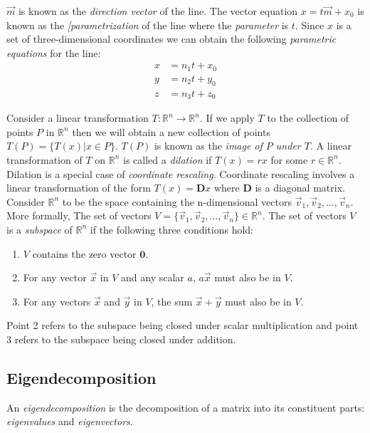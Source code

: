 \documentclass[12pt]{article}
\begin{document}
$\vec{m}$ is known as the \emph{direction vector} of the line. The vector equation $x=t\vec{m}+x_0$ is known as the \emph{[parametrization} of the line where the \emph{parameter} is $t$. Since $x$ is a set of three-dimensional coordinates we can obtain the following \emph{parametric equations} for the line:
\begin{align*}
x &= n_1t + x_0 \\
y &= n_2t + y_0 \\
z &= n_3t +z_0
\end{align*}

Consider a linear transformation $T:\mathbb{R}^n\rightarrow\mathbb{R}^n$. If we apply $T$ to the collection of points $P$ in $\mathbb{R}^n$ then we will obtain a new collection of points $T(P)=\{ T(x)|x\in P \}$. $T(P)$ is known as the \emph{image of $P$ under $T$}. A linear transformation of $T$ on $\mathbb{R}^n$ is called a \emph{dilation} if $T(x)=rx$ for some $r\in\mathbb{R}^n$. Dilation is a special case of \emph{coordinate rescaling}. Coordinate rescaling involves a linear transformation of the form $T(x)=\mathbf{D}x$ where $\mathbf{D}$ is a diagonal matrix.  \\

Consider $\mathbb{R}^n$ to be the space containing the n-dimensional vectors $\vec{v}_1,\vec{v}_2,\ldots,\vec{v}_n$. More formally, The set of vectors $V=\{\vec{v}_1,\vec{v}_2,\ldots,\vec{v}_n\}\in\mathbb{R}^n$. The set of vectors $V$ is a \emph{subspace} of $\mathbb{R}^n$ if the following three conditions hold:
\begin{enumerate}
\item $V$ contains the zero vector $\mathbf{0}$. 
\item For any vector $\vec{x}$ in $V$ and any scalar $a$, $a\vec{x}$ must also be in $V$.
\item For any vectors $\vec{x}$ and $\vec{y}$ in $V$, the sum $\vec{x}+\vec{y}$ must also be in $V$. \\
\end{enumerate}

Point 2 refers to the subspace being closed under scalar multiplication and point 3 refers to the subspace being closed under addition.

\subsection{Eigendecomposition}

An \emph{eigendecomposition} is the decomposition of a matrix into its constituent parts: \emph{eigenvalues} and \emph{eigenvectors}.\\
\end{document}

